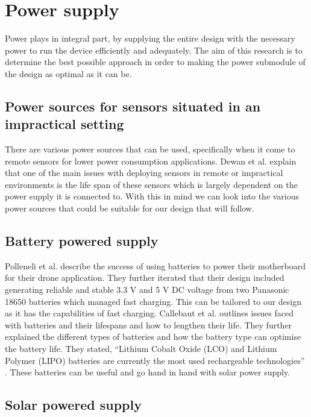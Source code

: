 \documentclass[class=report,11pt,crop=false]{standalone}
\begin{document}
\section{Power supply}


Power plays in integral part, by supplying the entire design with the necessary power to run the device efficiently and adequately. The aim of this research is to determine the best possible approach in order to making the power submodule of the design as optimal as it can be.

\subsection{Power sources for sensors situated in an impractical setting}

There are various power sources that can be used, specifically when it come to remote sensors for lower power consumption applications. Dewan et al. \cite{dewan2014alternative} explain that one of the main issues with deploying sensors in remote or impractical environments is the life span of these sensors which is largely dependent on the power supply it is connected to. With this in mind we can look into the various power sources that could be suitable for our design that will follow.

\subsection{Battery powered supply}

Polleneli et al. \cite{polonelli2020flexible} describe the success of using batteries to power their motherboard for their drone application. They further iterated that their design included generating reliable and stable 3.3 V and 5 V DC voltage from two Panasonic 18650 batteries which managed fast charging. This can be tailored to our design as it has the capabilities of fast charging. Callebaut et al. \cite{callebaut2021art} outlines issues faced with batteries and their lifespans and how to lengthen their life. They further explained the different types of batteries and how the battery type can optimise the battery life. They stated, “Lithium Cobalt Oxide (LCO) and Lithium Polymer (LIPO) batteries are currently the most used rechargeable technologies” \cite{callebaut2021art}. These batteries can be useful and go hand in hand with solar power supply.

\subsection{Solar powered supply}
\end{document}
